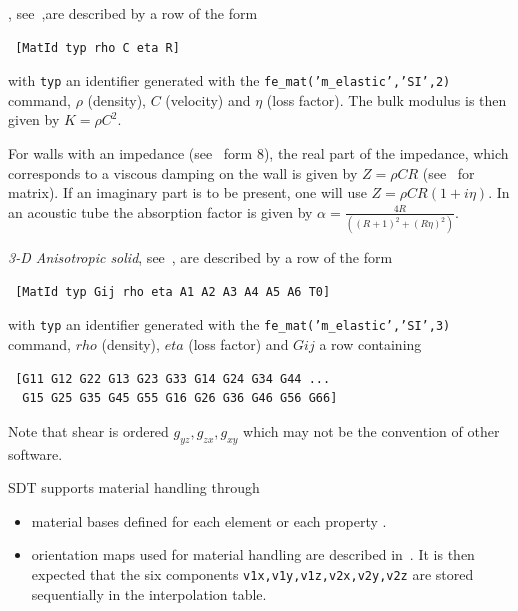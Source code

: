  , see~,are described by a row of the form

\begin{verbatim}
 [MatId typ rho C eta R]
\end{verbatim}


\noindent with {\tt typ} an identifier generated with the {\tt fe\_mat('m\_elastic','SI',2)} command, $\rho$ (density), $C$ (velocity) and $\eta$ (loss factor). The bulk modulus is then given by $K=\rho C^2$. 

For walls with an impedance (see~ form 8), the real part of the impedance, which corresponds to a viscous damping on the wall is given by {\tt $Z=\rho C R$} (see~ for matrix). If an imaginary part is to be present, one will use $Z=\rho C R(1+i \eta)$. In an acoustic tube the absorption factor is given by $\alpha=\frac{4R}{((R+1)^2+(R\eta)^2)}$. 


{\sl 3-D Anisotropic solid}, see~, are described by a row of the form

\begin{verbatim}
 [MatId typ Gij rho eta A1 A2 A3 A4 A5 A6 T0]
\end{verbatim}


with {\tt typ} an identifier generated with the {\tt fe\_mat('m\_elastic','SI',3)} command, $rho$ (density), $eta$ (loss factor) and $Gij$ a row containing 

\begin{verbatim}
 [G11 G12 G22 G13 G23 G33 G14 G24 G34 G44 ...
  G15 G25 G35 G45 G55 G16 G26 G36 G46 G56 G66]
\end{verbatim}

Note that shear is ordered $g_{yz}, g_{zx}, g_{xy}$ which may not be the convention of other software.

SDT supports material handling through 

\begin{itemize}
\item material bases defined for each element  or each property .
\item orientation maps used for material handling are described in~. It is then expected that the six components {\tt v1x,v1y,v1z,v2x,v2y,v2z} are stored sequentially in the interpolation table.
\end{itemize}


